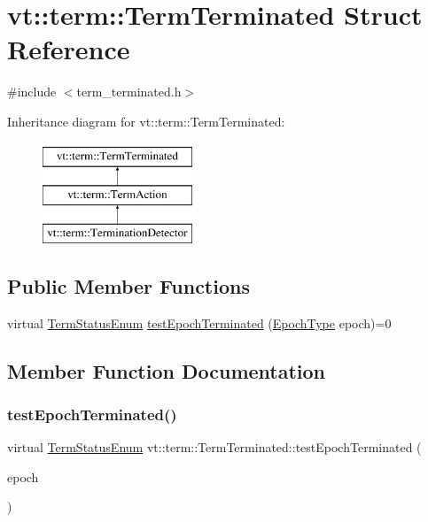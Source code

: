 \hypertarget{structvt_1_1term_1_1_term_terminated}{}\section{vt\+:\+:term\+:\+:Term\+Terminated Struct Reference}
\label{structvt_1_1term_1_1_term_terminated}


{\ttfamily \#include $<$term\+\_\+terminated.\+h$>$}

Inheritance diagram for vt\+:\+:term\+:\+:Term\+Terminated\+:\begin{figure}[H]
\begin{center}
\leavevmode
\includegraphics[height=3.000000cm]{structvt_1_1term_1_1_term_terminated}
\end{center}
\end{figure}
\subsection*{Public Member Functions}
\begin{DoxyCompactItemize}
\item 
virtual \hyperlink{namespacevt_1_1term_ad8ec9b371608fc88e7fdeef219785b27}{Term\+Status\+Enum} \hyperlink{structvt_1_1term_1_1_term_terminated_a9d23b646c13a95738f72f7abfc8774c7}{test\+Epoch\+Terminated} (\hyperlink{namespacevt_a985a5adf291c34a3ca263b3378388236}{Epoch\+Type} epoch)=0
\end{DoxyCompactItemize}


\subsection{Member Function Documentation}
\mbox{\label{structvt_1_1term_1_1_term_terminated_a9d23b646c13a95738f72f7abfc8774c7}} 
\subsubsection{\texorpdfstring{test\+Epoch\+Terminated()}{testEpochTerminated()}}
{\footnotesize\ttfamily virtual \hyperlink{namespacevt_1_1term_ad8ec9b371608fc88e7fdeef219785b27}{Term\+Status\+Enum} vt\+::term\+::\+Term\+Terminated\+::test\+Epoch\+Terminated (\begin{DoxyParamCaption}\item[{\hyperlink{namespacevt_a985a5adf291c34a3ca263b3378388236}{Epoch\+Type}}]{epoch }\end{DoxyParamCaption})\hspace{0.3cm}{\ttfamily [pure virtual]}}



